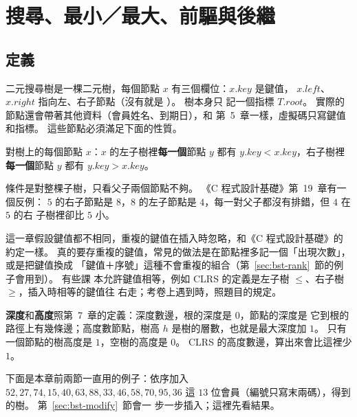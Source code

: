 \section{搜尋、最小／最大、前驅與後繼}
\label{sec:bst-query}

\subsection{定義}

二元搜尋樹是一棵二元樹，每個節點 $x$ 有三個欄位：$x.\mathit{key}$ 是鍵值，
$x.\mathit{left}$、$x.\mathit{right}$ 指向左、右子節點（沒有就是 \NIL）。 樹本身只
記一個指標 $T.\mathit{root}$。 實際的節點還會帶著其他資料（會員姓名、到期日），和
第~5~章一樣，虛擬碼只寫鍵值和指標。 這些節點必須滿足下面的性質。

\begin{definition}[二元搜尋樹性質]
\label{def:bst}
對樹上的每個節點 $x$：$x$ 的左子樹裡\textbf{每一個}節點 $y$ 都有 $y.\mathit{key} <
x.\mathit{key}$，右子樹裡\textbf{每一個}節點 $y$ 都有 $y.\mathit{key} >
x.\mathit{key}$。
\end{definition}

條件是對整棵子樹，只看父子兩個節點不夠。 《C 程式設計基礎》第~19~章有一個反例：
$5$ 的右子節點是 $8$，$8$ 的左子節點是 $4$，每一對父子都沒有排錯，但 $4$ 在 $5$ 的右
子樹裡卻比 $5$ 小。

這一章假設鍵值都不相同，重複的鍵值在插入時忽略，和《C 程式設計基礎》的約定一樣。
真的要存重複的鍵值，常見的做法是在節點裡多記一個「出現次數」，或是把鍵值換成
「鍵值＋序號」這種不會重複的組合（第~\ref{sec:bst-rank}~節的例子會用到）。 有些課
本允許鍵值相等，例如 CLRS 的定義是左子樹 $\le$、右子樹 $\ge$，插入時相等的鍵值往
右走；考卷上遇到時，照題目的規定。

\textbf{深度}和\textbf{高度}照第~7~章的定義：深度數邊，根的深度是 $0$，節點的深度是
它到根的路徑上有幾條邊；高度數節點，樹高 $h$ 是樹的層數，也就是最大深度加 $1$。 只有
一個節點的樹高度是 $1$，空樹的高度是 $0$。 CLRS 的高度數邊，算出來會比這裡少 $1$。

下面是本章前兩節一直用的例子：依序加入 $52,\allowbreak 27,\allowbreak 74,\allowbreak 15,\allowbreak 40,\allowbreak 63,\allowbreak 88,\allowbreak 33,\allowbreak 46,\allowbreak 58,\allowbreak 70,\allowbreak 95,\allowbreak 36$ 這 $13$ 位會員（編號只寫末兩碼），得到的樹。 第~\ref{sec:bst-modify}~節會一
步一步插入；這裡先看結果。

\begin{center}
\label{fig:bst-T}
\end{center}

